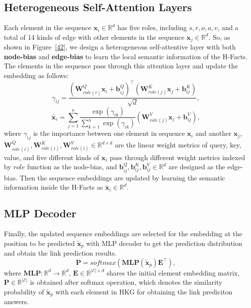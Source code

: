 \documentclass[11pt]{article}
\begin{document}
\subsection{Heterogeneous Self-Attention Layers}
 Each element in the sequence $\boldsymbol{x}_{i} \in \mathbb{R}^{d}$ has five roles, including $s,r,o,a,v$, and a total of 14 kinds of edge with other elements in the sequence  $\boldsymbol{x}_{j} \in \mathbb{R}^{d}$. So, as shown in Figure~\ref{42}, we design a heterogeneous self-attentive layer with both \textbf{node-bias} and \textbf{edge-bias} to learn the local semantic information of the H-Facts. The elements in the sequence pass through this attention layer and update the embedding as follows:
\begin{equation}
\gamma_{i j}=\frac{\left(\mathbf{W}_{role(i)}^{Q} \boldsymbol{x}_{i}+\mathbf{b}_{i j}^{Q}\right)^{\top}\left(\mathbf{W}_{role(j)}^{K} \boldsymbol{x}_{j}+\mathbf{b}_{i j}^{K}\right)}{\sqrt{d}},
\end{equation}
\begin{equation}
\tilde{\boldsymbol{x}_{i}}=\sum_{j=1}^{n} \frac{\exp \left(\gamma_{ik}\right)}{\sum_{k=1}^{n} \exp \left(\gamma_{ik}\right)}\left(\mathbf{W}_{role(j)}^{V} \boldsymbol{x}_{j}+\mathbf{b}_{ij}^{V}\right),
\end{equation}
where $\gamma_{i j}$ is the importance between one element in sequence $\boldsymbol{x}_i$ and another $\boldsymbol{x}_j$, $\mathbf{W}_{role(i)}^{Q}, \mathbf{W}_{role(i)}^{K},\mathbf{W}_{role(i)}^{V} \in \mathbb{R}^{d \times d}$ are the linear weight metrics of query, key, value, and five different kinds of $\boldsymbol{x}_{i}$ pass through different weight metrics indexed by $role$ function as the node-bias, and $\mathbf{b}_{i j}^{Q},  \mathbf{b}_{i j}^{K}, \mathbf{b}_{i j}^{V} \in \mathbb{R}^{d}$ are designed as the edge-bias. Then the sequence embeddings are updated by learning the semantic information inside the H-Facts as $\tilde{\boldsymbol{x}_{i}} \in \mathbb{R}^{d}$.



\subsection{MLP Decoder}
Finally, the updated sequence embeddings are selected for the embedding at the position to be predicted $\tilde{\boldsymbol{x}}_{p}$ with MLP decoder to get the prediction distribution and obtain the link prediction results.
\begin{equation}
\boldsymbol{P}=softmax(\boldsymbol{MLP}(\tilde{\boldsymbol{x}}_{p})\mathbf{E}^\top),
\end{equation}
where $\boldsymbol{MLP}:\mathbb{R}^{d}\rightarrow\mathbb{R}^{d}$, $\mathbf{E}\in \mathbb{R}^{|\mathcal{E}|\times d}$ shares the initial element embedding matrix, $\boldsymbol{P}\in \mathbb{R}^{|\mathcal{E}|}$ is obtained after softmax operation, which denotes the similarity probability of $\tilde{\boldsymbol{x}}_{p}$ with each element in HKG for obtaining the link prediciton answers.
\end{document}
